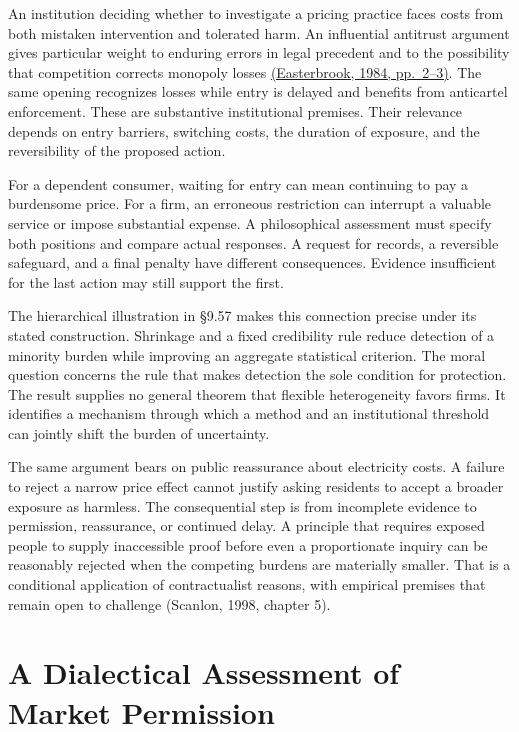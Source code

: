 \noindent \noindent An institution deciding whether to investigate a pricing
practice faces costs from both mistaken intervention and tolerated harm.
An influential antitrust argument gives particular weight to enduring
errors in legal precedent and to the possibility that competition
corrects monopoly losses
\href{https://chicagounbound.uchicago.edu/journal_articles/1153/}{(Easterbrook,
1984, pp.~2--3)}. The same opening recognizes losses while entry is
delayed and benefits from anticartel enforcement. These are substantive
institutional premises. Their relevance depends on entry barriers,
switching costs, the duration of exposure, and the reversibility of the
proposed action.

For a dependent consumer, waiting for entry can mean continuing to pay a
burdensome price. For a firm, an erroneous restriction can interrupt a
valuable service or impose substantial expense. A philosophical
assessment must specify both positions and compare actual responses. A
request for records, a reversible safeguard, and a final penalty have
different consequences. Evidence insufficient for the last action may
still support the first.

The hierarchical illustration in §9.57 makes this connection precise
under its stated construction. Shrinkage and a fixed credibility rule
reduce detection of a minority burden while improving an aggregate
statistical criterion. The moral question concerns the rule that makes
detection the sole condition for protection. The result supplies no
general theorem that flexible heterogeneity favors firms. It identifies
a mechanism through which a method and an institutional threshold can
jointly shift the burden of uncertainty.

The same argument bears on public reassurance about electricity costs. A
failure to reject a narrow price effect cannot justify asking residents
to accept a broader exposure as harmless. The consequential step is from
incomplete evidence to permission, reassurance, or continued delay. A
principle that requires exposed people to supply inaccessible proof
before even a proportionate inquiry can be reasonably rejected when the
competing burdens are materially smaller. That is a conditional
application of contractualist reasons, with empirical premises that
remain open to challenge (Scanlon, 1998, chapter 5).


\hypertarget{M09-a-dialectical-assessment-of-market-permission}{%
\section{A Dialectical Assessment of Market
Permission}\label{M09-a-dialectical-assessment-of-market-permission}}

